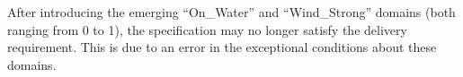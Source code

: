After introducing the emerging ``On\_Water'' and ``Wind\_Strong'' domains (both ranging from 0 to 1), the specification may no longer satisfy the delivery requirement. This is due to an error in the exceptional conditions about these domains. 
%
%
%
